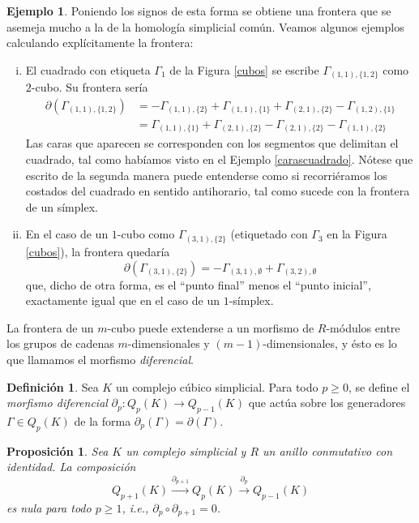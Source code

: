 \documentclass[12pt,a4paper,twoside]{article} %
\theoremstyle{plain}
\newtheorem{proposicion}{Proposición}[subsection]
\theoremstyle{definition}
\newtheorem{definicion}{Definición}[subsection]
\newtheorem{ejemplo}{Ejemplo}[subsection]
\newcommand{\map}[3]{#1 \colon #2 \to #3}
\begin{document}
\begin{ejemplo}
Poniendo los signos de esta forma se obtiene una frontera que se asemeja mucho a la de la homología simplicial común. Veamos algunos ejemplos calculando explícitamente la frontera:
\begin{enumerate}[(i)]
\item El cuadrado con etiqueta $\Gamma_1$ de la Figura \ref{cubos} se escribe $ \Gamma_{(1,1),\{1,2\}}$ como $2$-cubo. Su frontera sería
\begin{align*}
\partial \left( \Gamma_{(1,1),\{ 1,2 \}} \right) &= - \Gamma_{(1,1),\{ 2 \}} + \Gamma_{(1,1),\{ 1 \}} +  \Gamma_{(2,1),\{ 2 \}} - \Gamma_{(1,2),\{ 1 \}} \\
&= \Gamma_{(1,1),\{ 1 \}} + \Gamma_{(2,1),\{ 2 \}} - \Gamma_{(2,1),\{ 2 \}} - \Gamma_{(1,1),\{ 2 \}}
\end{align*}
Las caras que aparecen se corresponden con los segmentos que delimitan el cuadrado, tal como habíamos visto en el Ejemplo \ref{carascuadrado}. Nótese que escrito de la segunda manera puede entenderse como si recorriéramos los costados del cuadrado en sentido antihorario, tal como sucede con la frontera de un símplex.

\item En el caso de un $1$-cubo como $\Gamma_{(3,1),\{2\}}$ (etiquetado con $\Gamma_3$ en la Figura \ref{cubos}), la frontera quedaría
$$ \partial \left( \Gamma_{(3,1),\{ 2 \}} \right) = - \Gamma_{(3,1),\emptyset} + \Gamma_{(3,2),\emptyset} $$
que, dicho de otra forma, es el ``punto final'' menos el ``punto inicial'', exactamente igual que en el caso de un $1$-símplex.
\end{enumerate}
\end{ejemplo}

La frontera de un $m$-cubo puede extenderse a un morfismo de $R$-módulos entre los grupos de cadenas $m$-dimensionales y $(m-1)$-dimensionales, y ésto es lo que llamamos el morfismo \emph{diferencial}.

\begin{definicion}
Sea $K$ un complejo cúbico simplicial. Para todo $p\geq 0$, se define el \emph{morfismo diferencial} $\map{\partial_p}{Q_p(K)}{Q_{p-1}(K)}$ que actúa sobre los generadores $\Gamma \in Q_p(K)$ de la forma $\partial_p(\Gamma) = \partial(\Gamma)$.
\end{definicion}


\begin{proposicion}
Sea $K$ un complejo simplicial y $R$ un anillo conmutativo con identidad. La composición
$$ Q_{p+1}(K) \stackrel{\partial_{p+1}}{\longrightarrow} Q_p(K) \stackrel{\partial_p}{\longrightarrow} Q_{p-1}(K) $$
es nula para todo $p\geq 1$, i.e., $\partial_p \circ \partial_{p+1} = 0$.
\end{proposicion}
\end{document}
